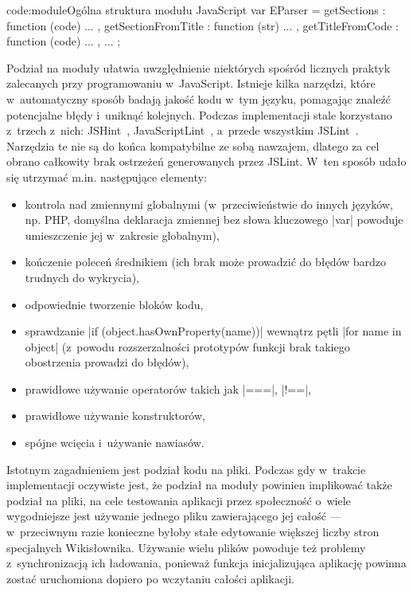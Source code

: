 \begin{jscode}{code:module}{Ogólna struktura modułu JavaScript}
var EParser = {
	getSections : function (code) {
		...
	},
	getSectionFromTitle : function (str) {
		...
	},
	getTitleFromCode : function (code) {
		...
	},
	...
};
\end{jscode}
Podział na moduły ułatwia uwzględnienie niektórych spośród licznych praktyk zalecanych przy programowaniu w~JavaScript. Istnieje kilka narzędzi, które w~automatyczny sposób badają jakość kodu w~tym języku, pomagając znaleźć potencjalne błędy i~uniknąć kolejnych. Podczas implementacji stale korzystano z~trzech z~nich: JSHint~\cite{jshint:doc}, JavaScriptLint~\cite{javascriptlint:doc}, a~przede wszystkim JSLint~\cite{jslint:doc}. Narzędzia te nie są do końca kompatybilne ze sobą nawzajem, dlatego za cel obrano całkowity brak ostrzeżeń generowanych przez JSLint. W~ten sposób udało się utrzymać m.in. następujące elementy:
\begin{itemize}
	\item kontrola nad zmiennymi globalnymi (w~przeciwieństwie do innych języków, np. PHP, domyślna deklaracja zmiennej bez słowa kluczowego \kod|var| powoduje umieszczenie jej w~zakresie globalnym),
	\item kończenie poleceń średnikiem (ich brak może prowadzić do błędów bardzo trudnych do wykrycia),
	\item odpowiednie tworzenie bloków kodu,
	\item sprawdzanie \kod|if (object.hasOwnProperty(name))| wewnątrz pętli \kod|for name in object| (z~powodu rozszerzalności prototypów funkcji brak takiego obostrzenia prowadzi do błędów),
	\item prawidłowe używanie operatorów takich jak \kod|===|, \kod|!==|,
	\item prawidłowe używanie konstruktorów,
	\item spójne wcięcia i~używanie nawiasów.
\end{itemize}

Istotnym zagadnieniem jest podział kodu na pliki. Podczas gdy w~trakcie implementacji oczywiste jest, że podział na moduły powinien implikować także podział na pliki, na cele testowania aplikacji przez społeczność o~wiele wygodniejsze jest używanie jednego pliku zawierającego jej całość --- w~przeciwnym razie konieczne byłoby stałe edytowanie większej liczby stron specjalnych Wikisłownika. Używanie wielu plików powoduje też problemy z~synchronizacją ich ładowania, ponieważ funkcja inicjalizująca aplikację powinna zostać uruchomiona dopiero po wczytaniu całości aplikacji.


